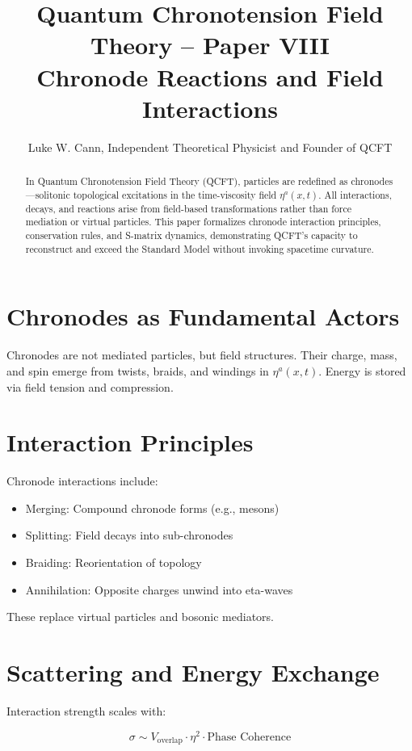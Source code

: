 \documentclass[12pt]{article}
\title{Quantum Chronotension Field Theory – Paper VIII\\Chronode Reactions and Field Interactions}
\author{Luke W. Cann, Independent Theoretical Physicist and Founder of QCFT}
\date{}
\begin{document}
\maketitle

\begin{abstract}
In Quantum Chronotension Field Theory (QCFT), particles are redefined as chronodes—solitonic topological excitations in the time-viscosity field $\eta^a(x,t)$. All interactions, decays, and reactions arise from field-based transformations rather than force mediation or virtual particles. This paper formalizes chronode interaction principles, conservation rules, and S-matrix dynamics, demonstrating QCFT’s capacity to reconstruct and exceed the Standard Model without invoking spacetime curvature.
\end{abstract}

\section{Chronodes as Fundamental Actors}

Chronodes are not mediated particles, but field structures. Their charge, mass, and spin emerge from twists, braids, and windings in $\eta^a(x,t)$. Energy is stored via field tension and compression.

\section{Interaction Principles}

Chronode interactions include:

\begin{itemize}
\item Merging: Compound chronode forms (e.g., mesons)
\item Splitting: Field decays into sub-chronodes
\item Braiding: Reorientation of topology
\item Annihilation: Opposite charges unwind into eta-waves
\end{itemize}

These replace virtual particles and bosonic mediators.

\section{Scattering and Energy Exchange}

Interaction strength scales with:

\[
\sigma \sim V_{\text{overlap}} \cdot \eta^2 \cdot \text{Phase Coherence}
\]
\end{document}
